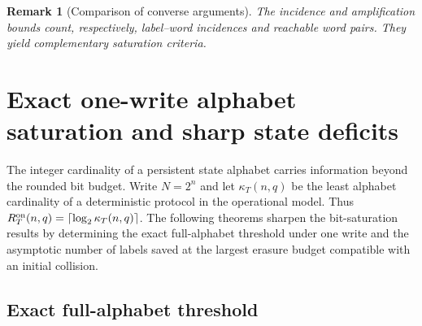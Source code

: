 \documentclass[11pt,a4paper]{article}
\newtheorem{remark}[theorem]{Remark}
\begin{document}
\begin{remark}[Comparison of converse arguments]
The incidence and amplification bounds count, respectively, label--word incidences and reachable word pairs. They yield complementary saturation criteria.
\end{remark}

\section{Exact one-write alphabet saturation and sharp state deficits}\label{sec:v3alphabet}

The integer cardinality of a persistent state alphabet carries information beyond the rounded bit budget. Write $N=2^n$ and let $\kappa_T(n,q)$ be the least alphabet cardinality of a deterministic protocol in the operational model. Thus $R_T^{\rm on}(n,q)=\lceil\log_2\kappa_T(n,q)\rceil$. The following theorems sharpen the bit-saturation results by determining the exact full-alphabet threshold under one write and the asymptotic number of labels saved at the largest erasure budget compatible with an initial collision.

\subsection{Exact full-alphabet threshold}
\end{document}
